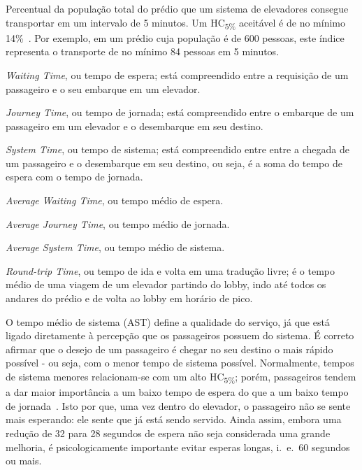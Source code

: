 \begin{description}[leftmargin=!,labelwidth=\widthof{\bfseries HC\textsubscript{5\%}}]
  \item[HC\textsubscript{5\%}]
  Percentual da população total do prédio que um sistema de elevadores consegue transportar em um intervalo de 5 minutos. Um HC\textsubscript{5\%} aceitável é de no mínimo 14\%~\cite{KOEHLEROTTIGER02}. Por exemplo, em um prédio cuja população é de 600 pessoas, este índice representa o transporte de no mínimo 84 pessoas em 5 minutos.

  \item[WT]
  \textit{Waiting Time}, ou tempo de espera; está compreendido entre a requisição de um passageiro e o seu embarque em um elevador.

  \item[JT]
  \textit{Journey Time}, ou tempo de jornada; está compreendido entre o embarque de um passageiro em um elevador e o desembarque em seu destino.

  \item[ST]
  \textit{System Time}, ou tempo de sistema; está compreendido entre entre a chegada de um passageiro e o desembarque em seu destino, ou seja, é a soma do tempo de espera com o tempo de jornada.

  \item[AWT]
  \textit{Average Waiting Time}, ou tempo médio de espera.

  \item[AJT]
  \textit{Average Journey Time}, ou tempo médio de jornada.

  \item[AST]
  \textit{Average System Time}, ou tempo médio de sistema.

  \item[RTT]
  \textit{Round-trip Time}, ou tempo de ida e volta em uma tradução livre; é o tempo médio de uma viagem de um elevador partindo do lobby, indo até todos os andares do prédio e de volta ao lobby em horário de pico.
\end{description}

O tempo médio de sistema (AST) define a qualidade do serviço, já que está ligado diretamente à percepção que os passageiros possuem do sistema. É correto afirmar que o desejo de um passageiro é chegar no seu destino o mais rápido possível - ou seja, com o menor tempo de sistema possível. Normalmente, tempos de sistema menores relacionam-se com um alto HC\textsubscript{5\%}; porém, passageiros tendem a dar maior importância a um baixo tempo de espera do que a um baixo tempo de jornada~\cite{KOEHLEROTTIGER02}. Isto por que, uma vez dentro do elevador, o passageiro não se sente mais esperando: ele sente que já está sendo servido. Ainda assim, embora uma redução de 32 para 28 segundos de espera não seja considerada uma grande melhoria, é psicologicamente importante evitar esperas longas, i.~e.~60 segundos ou mais.

